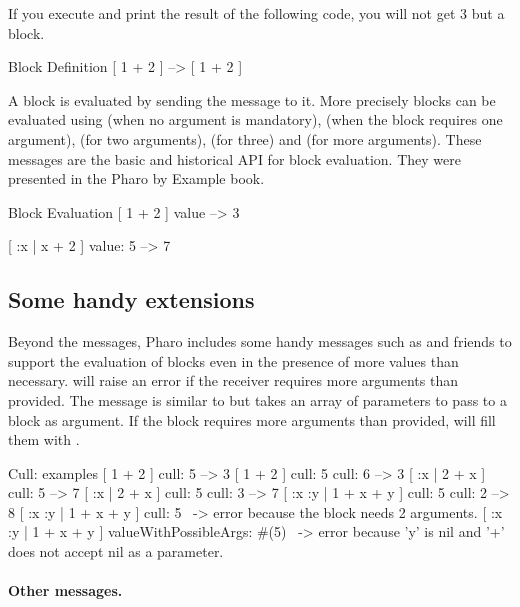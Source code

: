 \documentclass[a4paper,10pt,twoside]{book}
\begin{document}
If you execute and print the result of the following code, you will not get 3 but a block.

\begin{code}{Block Definition}
[ 1 + 2 ] --> [ 1 + 2 ]
\end{code}

 A block is evaluated by sending the  message to it. More precisely blocks can be evaluated using  (when no argument is mandatory),  (when the block requires one argument),  (for two arguments),  (for three) and  (for more arguments). These messages are the basic and historical API for block evaluation. They were presented in the Pharo by Example book.

\begin{code}{Block Evaluation}
[ 1 + 2 ] value --> 3

[ :x | x + 2 ] value: 5 --> 7
\end{code}

\subsection{Some handy extensions}

Beyond the  messages, Pharo includes some handy messages
such as  and friends to support the evaluation of blocks even
in the presence of more values than necessary.  will raise
an error if the receiver requires more arguments than provided. The
 message is similar to  but takes
an array of parameters to pass to a block as argument. If the block
requires more arguments than provided, 
will fill them with .

\begin{code}{Cull: examples}
[ 1 + 2 ] cull: 5 --> 3
[ 1 + 2 ] cull: 5 cull: 6 --> 3
[ :x | 2 + x ] cull: 5 --> 7
[ :x | 2 + x ] cull: 5 cull: 3 --> 7
[ :x :y | 1 + x + y ] cull: 5 cull: 2 --> 8
[ :x :y | 1 + x + y ] cull: 5 ~-> error because the block needs 2 arguments.
[ :x :y | 1 + x + y ] valueWithPossibleArgs: #(5)
                      ~-> error because 'y' is nil and '+' does not accept nil as a parameter.
\end{code}


\paragraph{Other messages.}
\end{document}
